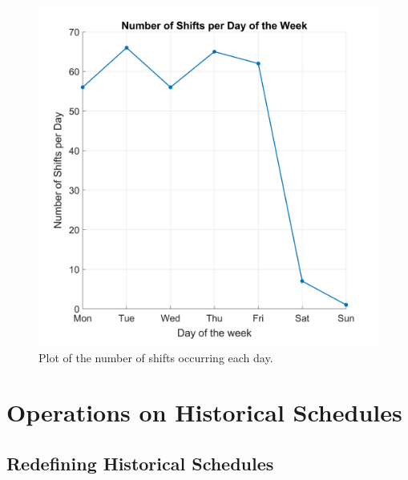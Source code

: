 

\begin{figure}[ht]
\begin{center}
\includegraphics[width=0.46\linewidth]{appendix/shift per day.png}
    
\end{center}
   \caption{Plot of the number of shifts occurring each day.}
\label{fig: Number of shifts per day}
\end{figure}


\section{Operations on Historical Schedules}

\subsection{Redefining Historical Schedules}
\label{subsection: redefine appexnix}

